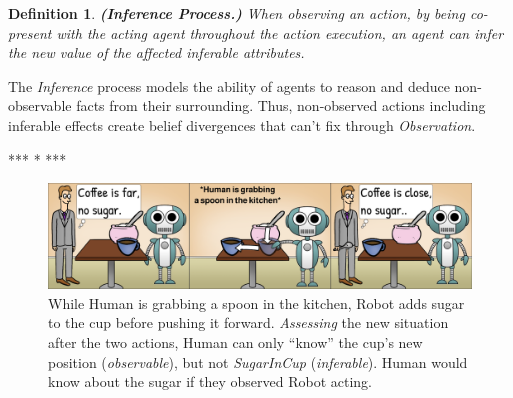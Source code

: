 \documentclass[letterpaper]{article} %
\newtheorem{definition}{Definition}
\begin{document}

\begin{definition} \label{def:inf}
    \textbf{(Inference Process.)} When observing an action, by being co-present with the acting agent throughout the action execution, an agent can infer the new value of the affected inferable attributes.  
\end{definition}


The \textit{Inference} process models the ability of agents to reason and deduce non-observable facts from their surrounding. Thus, non-observed actions including inferable effects create belief divergences that can't fix through \textit{Observation}. 

*** * *** %

\begin{figure}[t!]
    \centering
    \includegraphics[width=1.0\linewidth]{figures/cartoon_obs(2).png}
    \caption{
    While Human is grabbing a spoon in the kitchen, Robot adds sugar to the cup before pushing it forward. \textit{Assessing} the new situation after the two actions, Human can only ``know'' the cup's new position (\textit{observable}), but not \textit{SugarInCup} (\textit{inferable}). Human would know about the sugar if they observed Robot acting.
    }
    \label{fig:cartoon}
\end{figure}
\end{document}
